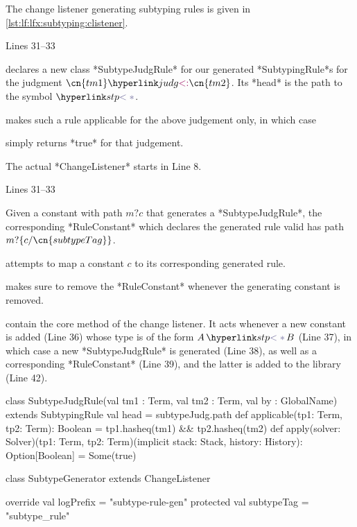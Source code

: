 \begin{example}
	The change listener generating subtyping rules is given in \autoref{lst:lf:lfx:subtyping:clistener}.
	\begin{labeling}{Lines 31--33}
	\item[Line 1] declares a new class *SubtypeJudgRule* for our generated *SubtypingRule*s for the judgment $\subtp{\cn{tm1}}{\cn{tm2}}$. Its *head* is the path to the symbol $\stpsym$.
	\item[Line 3] makes such a rule applicable for the above judgement only, in which case
	\item[Line 4/5] simply returns *true* for that judgement.
	\end{labeling}
	The actual *ChangeListener* starts in Line 8.
	\begin{labeling}{Lines 31--33}
	\item[Line 12] Given a constant with path $m?c$ that generates a *SubtypeJudgRule*, the corresponding *RuleConstant* which declares the generated rule valid has path $m?\{c/\cn{subtypeTag}\}$.
	\item[Line 16] attempts to map a constant $c$ to its corresponding generated rule.
	\item[Lines 31--33] makes sure to remove the *RuleConstant* whenever the generating constant is removed.
	\item[Lines 35--47] contain the core method of the change listener. It acts whenever a new constant is added (Line 36) whose type
		is of the form $\stp AB$ (Line 37), in which case a new *SubtypeJudgRule* is generated (Line 38), as well as a corresponding
		*RuleConstant* (Line 39), and the latter is added to the library (Line 42).
	\end{labeling}
	
		\begin{nscalacode}[label=lst:lf:lfx:subtyping:clistener,caption={A Change Listener Generating Subtyping Rules  \protect\footnotemark},emph={SubtypeJudgRule,subtypeJudg,RuleConstant}]
class SubtypeJudgRule(val tm1 : Term, val tm2 : Term, val by : GlobalName) extends SubtypingRule {
  val head = subtypeJudg.path
  def applicable(tp1: Term, tp2: Term): Boolean = tp1.hasheq(tm1) && tp2.hasheq(tm2)
  def apply(solver: Solver)(tp1: Term, tp2: Term)(implicit stack: Stack, history: History): Option[Boolean]
   = Some(true)
}

class SubtypeGenerator extends ChangeListener {
  override val logPrefix = "subtype-rule-gen"
  protected val subtypeTag = "subtype_rule"

}
\end{nscalacode}
\end{example}
